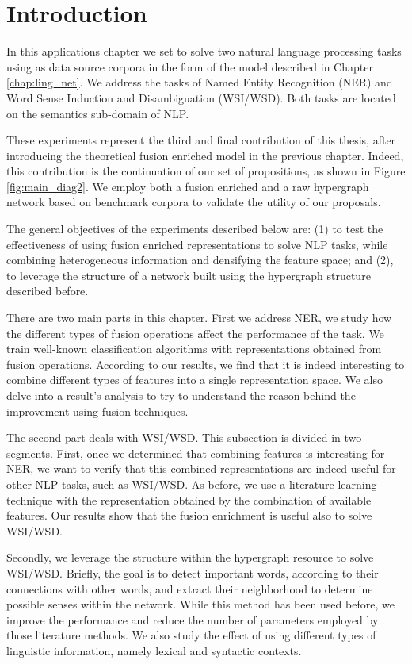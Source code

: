 \minitoc
\section{Introduction}
In this applications chapter we set to solve two natural language processing tasks using as data source corpora in the form of the model described in Chapter \ref{chap:ling_net}. We address the tasks of Named Entity Recognition (NER) and Word Sense Induction and Disambiguation (WSI/WSD). Both tasks are located on the  semantics sub-domain of NLP. 

These experiments represent the third and final contribution of this thesis, after introducing the theoretical fusion enriched model in the previous chapter. Indeed, this contribution is the continuation of our set of propositions, as shown in Figure \ref{fig:main_diag2}. We employ both a fusion enriched and a raw hypergraph network based on benchmark corpora to validate the utility of our proposals.

The general objectives of the experiments described below are: (1) to test the effectiveness of using fusion enriched representations to solve NLP tasks, while combining heterogeneous information and densifying the feature space;  and (2), to leverage the structure of a network built using the hypergraph structure described before.

There are two main parts  in this chapter. First we address NER, we study how the different types of fusion operations affect the performance of the task. We train well-known classification algorithms with representations obtained from fusion operations.  According to our results, we find that it is indeed interesting to combine different types of features into a single representation space. We also delve into a result's analysis to try to understand the reason behind the improvement using fusion techniques.

The second part deals with WSI/WSD. This subsection is divided in two segments. First, once we determined that combining features is interesting for NER, we want to verify that this combined representations are indeed useful for other NLP tasks, such as WSI/WSD. As before, we use a literature learning technique with the representation obtained by the combination of available features. Our results show that the fusion enrichment is useful also to solve WSI/WSD.

Secondly, we leverage the structure within the hypergraph resource to solve WSI/WSD. Briefly, the goal is to detect important words, according to their connections with other words, and extract their neighborhood to determine possible senses  within the network. While this method has been used before, we improve the performance and reduce the number of parameters employed by those literature methods. We also study the effect of using different types of linguistic information, namely lexical and syntactic contexts.

